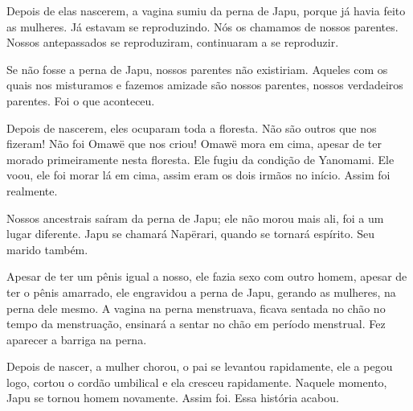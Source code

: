 Depois de elas nascerem, a vagina sumiu da perna de Japu, porque já
havia feito as mulheres. Já estavam se reproduzindo. Nós os chamamos de
nossos parentes. Nossos antepassados se reproduziram, continuaram a se
reproduzir. 

Se não fosse a perna de Japu, nossos parentes não existiriam. Aqueles
com os quais nos misturamos e fazemos amizade são nossos parentes,
nossos verdadeiros parentes. Foi o que aconteceu.

Depois de nascerem, eles ocuparam toda a floresta. Não são outros que
nos fizeram! Não foi Omawë que nos criou! Omawë mora em cima, apesar de
ter morado primeiramente nesta floresta. Ele fugiu da condição de
Yanomami. Ele voou, ele foi morar lá em cima, assim eram os dois irmãos
no início. Assim foi realmente. 

Nossos ancestrais saíram da perna de Japu; ele não morou mais ali, foi a
um lugar diferente. Japu se chamará Napërari, quando se tornará
espírito. Seu marido também.

Apesar de ter um pênis igual a nosso, ele fazia sexo com outro homem,
apesar de ter o pênis amarrado, ele engravidou a perna de Japu, gerando
as mulheres, na perna dele mesmo. A vagina na perna menstruava, ficava
sentada no chão no tempo da menstruação, ensinará a sentar no chão em
período menstrual. Fez aparecer a barriga na perna. 

Depois de nascer, a mulher chorou, o pai se levantou rapidamente, ele a
pegou logo, cortou o cordão umbilical e ela cresceu rapidamente. Naquele
momento, Japu se tornou homem novamente. Assim foi. Essa história
acabou.
